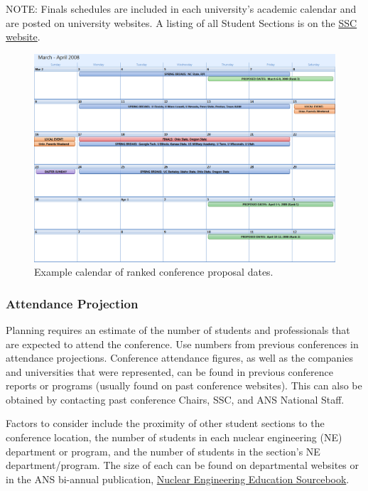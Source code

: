 \documentclass[12pt]{article}
\begin{document}
NOTE: Finals schedules are included in each university's academic calendar and are posted on university websites. A listing of all Student Sections is on the \href{http://students.ans.org}{SSC website}.

\begin{figure}[h]
\centering
\includegraphics[width=16cm]{conference_dates.png}
\caption{Example calendar of ranked conference proposal dates.}
\label{fig:conference_dates}
\end{figure}

\subsubsection{Attendance Projection}
Planning requires an estimate of the number of students and professionals that are expected to attend the conference. Use numbers from previous conferences in attendance projections. Conference attendance figures, as well as the companies and universities that were represented, can be found in previous conference reports or programs (usually found on past conference websites). This can also be obtained by contacting past conference Chairs, SSC, and ANS National Staff.

Factors to consider include the proximity of other student sections to the conference location, the number of students in each nuclear engineering (NE) department or program, and the number of students in the section's NE department/program. The size of each can be found on departmental websites or in the ANS bi-annual publication, \href{https://www.energy.gov/ne/downloads/nuclear-science-and-engineering-education-sourcebook}{Nuclear Engineering Education Sourcebook}.
\end{document}
